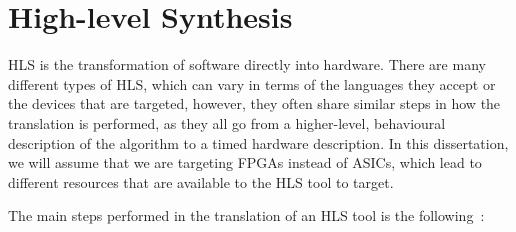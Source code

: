 \section{High-level Synthesis}%
\label{sec:bg:hls}

\Gls{HLS} is the transformation of software directly into hardware.  There are
many different types of \gls{HLS}, which can vary in terms of the languages they
accept or the devices that are targeted, however, they often share similar steps
in how the translation is performed, as they all go from a higher-level,
behavioural description of the algorithm to a timed hardware description.  In
this dissertation, we will assume that we are targeting \glspl{FPGA} instead of
\glspl{ASIC}, which lead to different resources that are available to the
\gls{HLS} tool to target.

The main steps performed in the translation of an \gls{HLS} tool is the
following~\cite{coussy09_introd_to_high_level_synth,canis13_legup}:

